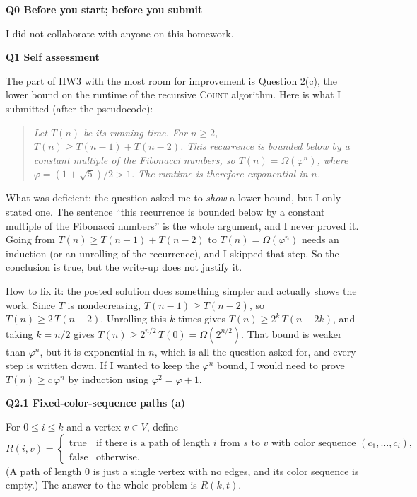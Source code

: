 \documentclass[11pt]{article}
\newcommand{\algo}[1]{\textsc{#1}}
\newcommand{\qpage}[1]{\clearpage\noindent\textbf{\large #1}\par\medskip}
\begin{document}
\noindent\textbf{\large Q0 Before you start; before you submit}\par\medskip

I did not collaborate with anyone on this homework.
    

\qpage{Q1 Self assessment}

    The part of HW3 with the most room for improvement is Question 2(c), the lower bound on the runtime of the recursive \algo{Count} algorithm.
    Here is what I submitted (after the pseudocode):

    \begin{quote}
\emph{Let $T(n)$ be its running time. For $n \ge 2$, $T(n) \ge T(n-1) + T(n-2)$. This recurrence is bounded below by a constant multiple of the Fibonacci numbers, so $T(n) = \Omega(\varphi^n)$, where $\varphi = (1+\sqrt{5})/2 > 1$. The runtime is therefore exponential in $n$.}
    \end{quote}

    What was deficient: the question asked me to \emph{show} a lower bound, but I only stated one.
    The sentence ``this recurrence is bounded below by a constant multiple of the Fibonacci numbers'' is the whole argument, and I never proved it.
    Going from $T(n) \ge T(n-1)+T(n-2)$ to $T(n) = \Omega(\varphi^n)$ needs an induction (or an unrolling of the recurrence), and I skipped that step.
    So the conclusion is true, but the write-up does not justify it.

    How to fix it: the posted solution does something simpler and actually shows the work.
    Since $T$ is nondecreasing, $T(n-1) \ge T(n-2)$, so $T(n) \ge 2\,T(n-2)$.
    Unrolling this $k$ times gives $T(n) \ge 2^{k}\, T(n-2k)$, and taking $k = n/2$ gives $T(n) \ge 2^{n/2}\, T(0) = \Omega(2^{n/2})$.
    That bound is weaker than $\varphi^n$, but it is exponential in $n$, which is all the question asked for, and every step is written down.
    If I wanted to keep the $\varphi^n$ bound, I would need to prove $T(n) \ge c\,\varphi^n$ by induction using $\varphi^2 = \varphi + 1$.
  

\qpage{Q2.1 Fixed-color-sequence paths (a)}

For $0 \le i \le k$ and a vertex $v \in V$, define
\[
  R(i,v) = \begin{cases}
    \text{true} & \text{if there is a path of length $i$ from $s$ to $v$ with color sequence $(c_1,\dots,c_i)$,}\\
    \text{false} & \text{otherwise.}
  \end{cases}
\]
(A path of length $0$ is just a single vertex with no edges, and its color sequence is empty.)
The answer to the whole problem is $R(k,t)$.
\end{document}
